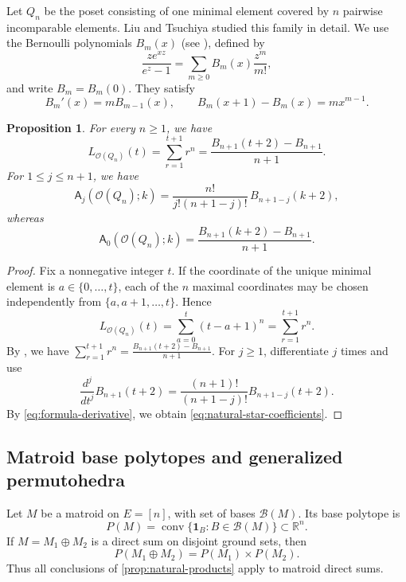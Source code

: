 \documentclass[reqno, 12pt]{article}
\numberwithin{equation}{section}
\newtheorem{proposition}[theorem]{Proposition}
\theoremstyle{definition}
\newcommand{\R}{\mathbb{R}}
\newcommand{\conv}{\operatorname{conv}}
\newcommand{\A}{\mathsf{A}}
\begin{document}
Let $Q_n$ be the poset consisting of one minimal element covered by $n$ pairwise incomparable elements.  Liu and Tsuchiya
\cite{LiuTsuchiya2019} studied this family in detail.  We use the Bernoulli polynomials $B_m(x)$ (see \cite{Book-Bernoulli}), defined by
\[\frac{ze^{xz}}{e^z-1}=\sum_{m\geq0}B_m(x)\frac{z^m}{m!},
\]
and write $B_m=B_m(0)$.  They satisfy
\begin{equation*}
B_m'(x)=mB_{m-1}(x),\qquad B_m(x+1)-B_m(x)=mx^{m-1}.
\end{equation*}

\begin{proposition}\label{prop:natural-star-poset}
For every $n\geq1$, we have 
\[L_{\mathcal O(Q_n)}(t)=\sum_{r=1}^{t+1}r^n=\frac{B_{n+1}(t+2)-B_{n+1}}{n+1}.
\]
For $1\leq j\leq n+1$, we have 
\begin{equation}\label{eq:natural-star-coefficients}
\A_j(\mathcal O(Q_n);k)=\frac{n!}{j!(n+1-j)!}\,B_{n+1-j}(k+2),
\end{equation}
whereas
\[\A_0(\mathcal O(Q_n);k)=\frac{B_{n+1}(k+2)-B_{n+1}}{n+1}.
\]
\end{proposition}
\begin{proof}
Fix a nonnegative integer $t$.  If the coordinate of the unique minimal
element is $a\in\{0,\ldots,t\}$, each of the $n$ maximal coordinates may
be chosen independently from $\{a,a+1,\ldots,t\}$.  Hence
\[L_{\mathcal O(Q_n)}(t)=\sum_{a=0}^{t}(t-a+1)^n=\sum_{r=1}^{t+1}r^n.
\]
By \cite[Remark 4.10]{Book-Bernoulli}, we have $\sum_{r=1}^{t+1}r^n=\frac{B_{n+1}(t+2)-B_{n+1}}{n+1}$.
For $j\geq1$, differentiate $j$ times and use
\[\frac{d^j}{dt^j}B_{n+1}(t+2)=\frac{(n+1)!}{(n+1-j)!}B_{n+1-j}(t+2).
\]
By \eqref{eq:formula-derivative}, we obtain \eqref{eq:natural-star-coefficients}.
\end{proof}


\subsection{Matroid base polytopes and generalized permutohedra}

Let $M$ be a matroid on $E=[n]$, with set of bases $\mathcal B(M)$.  Its
base polytope is
\[
 P(M)=\conv\{\mathbf 1_B:B\in\mathcal B(M)\}\subset\R^n.
\]
If $M=M_1\oplus M_2$ is a direct sum on disjoint ground sets, then
\begin{equation*}
 P(M_1\oplus M_2)=P(M_1)\times P(M_2).
\end{equation*}
Thus all conclusions of \cref{prop:natural-products} apply to matroid
direct sums.
\end{document}
